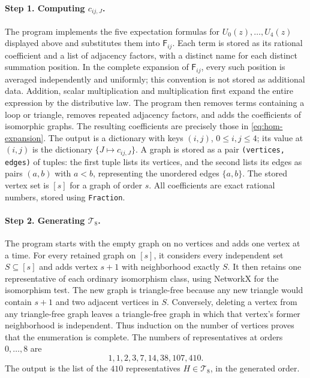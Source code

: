\documentclass[11pt]{article}
\begin{document}
\paragraph{Step 1. Computing $c_{ij,J}$.}
The program \href{https://github.com/Diudiutse/triangle-free-signless-laplacian/blob/main/programs/01_expand_F.py}{} implements the five expectation formulas
for $U_0(z),\ldots,U_4(z)$ displayed above and substitutes them into
$\mathsf F_{ij}$.
Each term is stored as its rational coefficient and a list of adjacency
factors, with a distinct name for each distinct summation position.
In the complete expansion of $\mathsf F_{ij}$, every such position is
averaged independently and uniformly; this convention is not stored as
additional data.
Addition, scalar multiplication and multiplication first expand the
entire expression by the distributive law.
The program then removes terms containing a loop or triangle, removes
repeated adjacency factors, and adds the coefficients of isomorphic graphs.
The resulting coefficients are precisely those in \eqref{eq:hom-expansion}.
The output \href{https://github.com/Diudiutse/triangle-free-signless-laplacian/blob/main/programs/results/01/c_ij_J.pkl}{} is a dictionary with keys $(i,j)$,
$0\leq i,j\leq4$; its value at $(i,j)$ is the dictionary
$\{J\mapsto c_{ij,J}\}$.
A graph is stored as a pair \texttt{(vertices, edges)} of tuples:
the first tuple lists its vertices, and the second lists its edges as pairs
$(a,b)$ with $a<b$, representing the unordered edges $\{a,b\}$.
The stored vertex set is $[s]$ for a graph of order $s$.
All coefficients are exact rational numbers, stored using
\texttt{Fraction}.

\paragraph{Step 2. Generating $\mathcal T_8$.}
The program \href{https://github.com/Diudiutse/triangle-free-signless-laplacian/blob/main/programs/02_generate_tau8.py}{} starts with the empty graph on no
vertices and adds one vertex at a time.
For every retained graph on $[s]$, it considers every independent set
$S\subseteq[s]$ and adds vertex $s+1$ with neighborhood exactly $S$.
It then retains one representative of each ordinary isomorphism class,
using NetworkX for the isomorphism test.
The new graph is triangle-free because any new triangle would contain
$s+1$ and two adjacent vertices in $S$.
Conversely, deleting a vertex from any triangle-free graph leaves a
triangle-free graph in which that vertex's former neighborhood is independent.
Thus induction on the number of vertices proves that the enumeration is complete.
The numbers of representatives at orders $0,\ldots,8$ are
\[
1,1,2,3,7,14,38,107,410.
\]
The output \href{https://github.com/Diudiutse/triangle-free-signless-laplacian/blob/main/programs/results/02/tau_8.pkl}{} is the list of the $410$ representatives
$H\in\mathcal T_8$, in the generated order.
\end{document}
